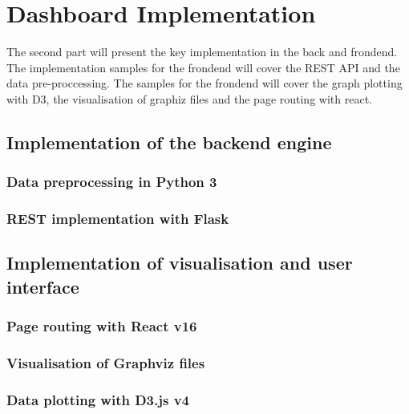 \documentclass[american,a4paper,oneside,,tablecaptionabove]{scrbook}
\begin{document}
\section{Dashboard Implementation}\label{dashboard-implementation}

The second part will present the key implementation in the back and
frondend. The implementation samples for the frondend will cover the
REST API and the data pre-proccessing. The samples for the frondend will
cover the graph plotting with D3, the visualisation of graphiz files and
the page routing with react.

\subsection{Implementation of the backend
engine}\label{implementation-of-the-backend-engine}

\subsubsection{Data preprocessing in Python
3}\label{data-preprocessing-in-python-3}

\subsubsection{REST implementation with
Flask}\label{rest-implementation-with-flask}

\subsection{Implementation of visualisation and user
interface}\label{implementation-of-visualisation-and-user-interface}

\subsubsection{Page routing with React
v16}\label{page-routing-with-react-v16}

\subsubsection{Visualisation of Graphviz
files}\label{visualisation-of-graphviz-files}

\subsubsection{Data plotting with D3.js
v4}\label{data-plotting-with-d3.js-v4}
\end{document}
